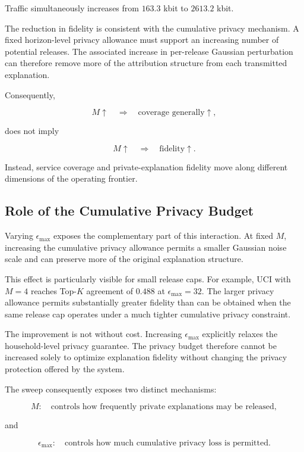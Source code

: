 \documentclass[11pt]{article}
\begin{document}
Traffic simultaneously increases from \(163.3\) kbit to \(2613.2\) kbit.

The reduction in fidelity is consistent with the cumulative privacy mechanism. A fixed horizon-level privacy allowance must support an increasing number of potential releases. The associated increase in per-release Gaussian perturbation can therefore remove more of the attribution structure from each transmitted explanation.

Consequently,

$$
M\uparrow
\quad\Longrightarrow\quad
\text{coverage generally}\uparrow,
$$

does not imply

$$
M\uparrow
\quad\Longrightarrow\quad
\text{fidelity}\uparrow.
$$

Instead, service coverage and private-explanation fidelity move along different dimensions of the operating frontier.

\subsection{Role of the Cumulative Privacy Budget}

Varying \(\epsilon_{\max}\) exposes the complementary part of this interaction. At fixed \(M\), increasing the cumulative privacy allowance permits a smaller Gaussian noise scale and can preserve more of the original explanation structure.

This effect is particularly visible for small release caps. For example, UCI with \(M=4\) reaches Top-\(K\) agreement of \(0.488\) at \(\epsilon_{\max}=32\). The larger privacy allowance permits substantially greater fidelity than can be obtained when the same release cap operates under a much tighter cumulative privacy constraint.

The improvement is not without cost. Increasing \(\epsilon_{\max}\) explicitly relaxes the household-level privacy guarantee. The privacy budget therefore cannot be increased solely to optimize explanation fidelity without changing the privacy protection offered by the system.

The sweep consequently exposes two distinct mechanisms:

$$
M:
\quad
\text{controls how frequently private explanations may be released},
$$

and

$$
\epsilon_{\max}:
\quad
\text{controls how much cumulative privacy loss is permitted}.
$$
\end{document}
